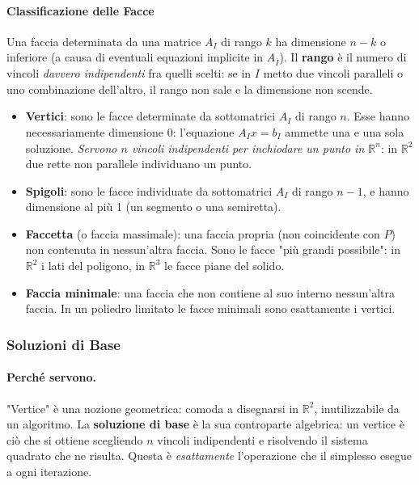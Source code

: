 \documentclass[12pt]{extarticle} %
\begin{document}
\paragraph{Classificazione delle Facce}
Una faccia determinata da una matrice $A_I$ di rango $k$ ha dimensione $n-k$ o inferiore (a causa di eventuali equazioni implicite in $A_{\overline{I}}$). Il \textbf{rango} è il numero di vincoli \emph{davvero indipendenti} fra quelli scelti: se in $I$ metto due vincoli paralleli o uno combinazione dell'altro, il rango non sale e la dimensione non scende.
\begin{itemize}
    \item \textbf{Vertici}: sono le facce determinate da sottomatrici $A_I$ di rango $n$. Esse hanno necessariamente dimensione 0: l'equazione $A_I x = b_I$ ammette una e una sola soluzione. \emph{Servono $n$ vincoli indipendenti per inchiodare un punto in $\mathbb{R}^n$}: in $\mathbb{R}^2$ due rette non parallele individuano un punto.
    \item \textbf{Spigoli}: sono le facce individuate da sottomatrici $A_I$ di rango $n-1$, e hanno dimensione al più 1 (un segmento o una semiretta).
    \item \textbf{Faccetta} (o faccia massimale): una faccia propria (non coincidente con $P$) non contenuta in nessun'altra faccia. Sono le facce "più grandi possibile": in $\mathbb{R}^2$ i lati del poligono, in $\mathbb{R}^3$ le facce piane del solido.
    \item \textbf{Faccia minimale}: una faccia che non contiene al suo interno nessun'altra faccia. In un poliedro limitato le facce minimali sono esattamente i vertici.
\end{itemize}

\subsubsection{Soluzioni di Base}

\paragraph{Perché servono.} "Vertice" è una nozione geometrica: comoda a disegnarsi in $\mathbb{R}^2$, inutilizzabile da un algoritmo. La \textbf{soluzione di base} è la sua controparte algebrica: un vertice è ciò che si ottiene scegliendo $n$ vincoli indipendenti e risolvendo il sistema quadrato che ne risulta. Questa è \emph{esattamente} l'operazione che il simplesso esegue a ogni iterazione.
\end{document}
